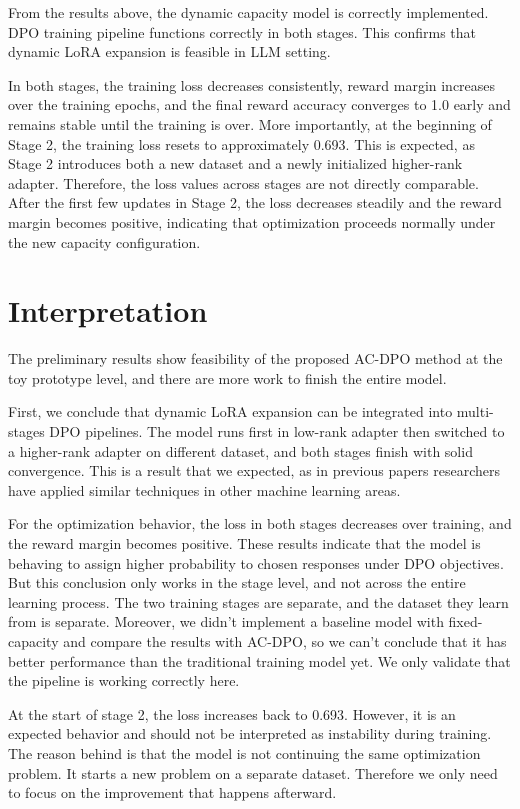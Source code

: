 \documentclass{article}
\begin{document}
From the results above, the dynamic capacity model is correctly implemented. DPO training pipeline functions correctly in both stages. This confirms that dynamic LoRA expansion is feasible in LLM setting.

In both stages, the training loss decreases consistently, reward margin increases over the training epochs, and the final reward accuracy converges to 1.0 early and remains stable until the training is over. More importantly, at the beginning of Stage 2, the training loss resets to approximately 0.693. This is expected, as Stage 2 introduces both a new dataset and a newly initialized higher-rank adapter. Therefore, the loss values across stages are not directly comparable. After the first few updates in Stage 2, the loss decreases steadily and the reward margin becomes positive, indicating that optimization proceeds normally under the new capacity configuration.

\section{Interpretation}
The preliminary results show feasibility of the proposed AC-DPO method at the toy prototype level, and there are more work to finish the entire model.

First, we conclude that dynamic LoRA expansion can be integrated into multi-stages DPO pipelines. The model runs first in low-rank adapter then switched to a higher-rank adapter on different dataset, and both stages finish with solid convergence. This is a result that we expected, as in previous papers researchers have applied similar techniques in other machine learning areas.

For the optimization behavior, the loss in both stages decreases over training, and the reward margin becomes positive. These results indicate that the model is behaving to assign higher probability to chosen responses under DPO objectives. But this conclusion only works in the stage level, and not across the entire learning process. The two training stages are separate, and the dataset they learn from is separate. Moreover, we didn't implement a baseline model with fixed-capacity and compare the results with AC-DPO, so we can't conclude that it has better performance than the traditional training model yet. We only validate that the pipeline is working correctly here.

At the start of stage 2, the loss increases back to 0.693. However, it is an expected behavior and should not be interpreted as instability during training. The reason behind is that the model is not continuing the same optimization problem. It starts a new problem on a separate dataset. Therefore we only need to focus on the improvement that happens afterward.
\end{document}
